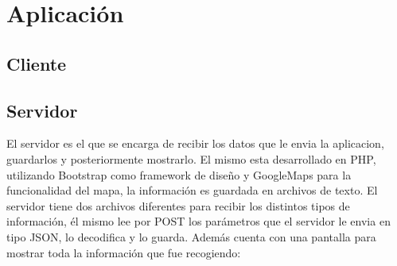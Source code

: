 \section{Aplicación}

\subsection{Cliente}

\subsection{Servidor}

El servidor es el que se encarga de recibir los datos que le envia la aplicacion, guardarlos y posteriormente mostrarlo. El mismo esta desarrollado en PHP, utilizando Bootstrap como framework de diseño y GoogleMaps para la funcionalidad del mapa, la información es guardada en archivos de texto.
El servidor tiene dos archivos diferentes para recibir los distintos tipos de información, él mismo lee por POST los parámetros que el servidor le envia en tipo JSON, lo decodifica y lo guarda.
Además cuenta con una pantalla para mostrar toda la información que fue recogiendo:


